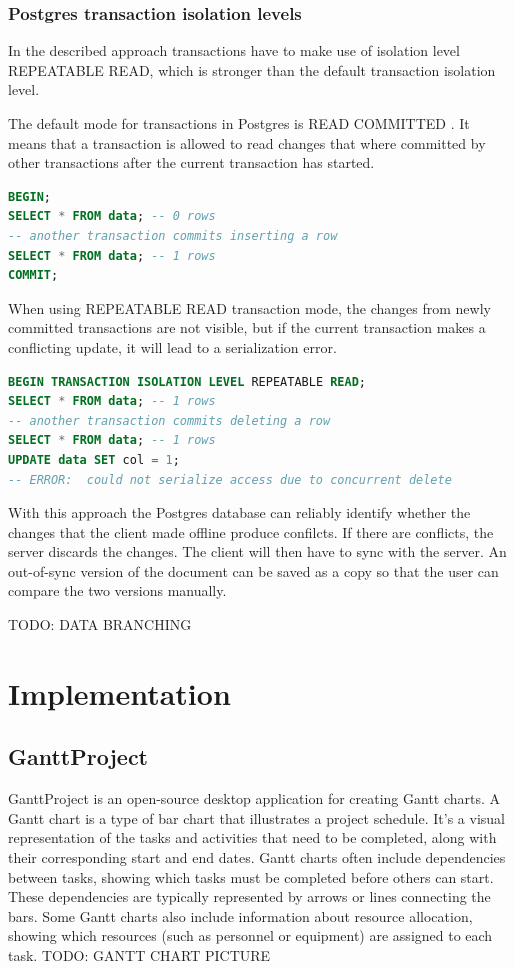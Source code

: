 \documentclass[a4paper, 11pt, oneside]{article}
\theoremstyle{definition}
\begin{document}
\subsubsection{Postgres transaction isolation levels} 
In the described approach transactions have to make use of isolation level REPEATABLE READ, which is stronger than the default transaction isolation level.

The default mode for transactions in Postgres is READ COMMITTED \cite{tisolevel}. It means that a transaction is allowed to read changes that where committed by other transactions after the current transaction has started. 

\begin{lstlisting}[language=SQL]
BEGIN;
SELECT * FROM data; -- 0 rows
-- another transaction commits inserting a row
SELECT * FROM data; -- 1 rows
COMMIT;
\end{lstlisting}

When using REPEATABLE READ transaction mode, the changes from newly committed transactions are not visible, but if the current transaction makes a conflicting update, it will lead to a serialization error.

\begin{lstlisting}[language=SQL]
BEGIN TRANSACTION ISOLATION LEVEL REPEATABLE READ;
SELECT * FROM data; -- 1 rows
-- another transaction commits deleting a row
SELECT * FROM data; -- 1 rows
UPDATE data SET col = 1;
-- ERROR:  could not serialize access due to concurrent delete
\end{lstlisting}

With this approach the Postgres database can reliably identify whether the changes that the client made offline produce confilcts. If there are conflicts, the server discards the changes. The client will then have to sync with the server. An out-of-sync version of the document can be saved as a copy so that the user can compare the two versions manually.

TODO: DATA BRANCHING

\section{Implementation}

\subsection{GanttProject}

GanttProject is an open-source desktop application for creating Gantt charts. A Gantt chart is a type of bar chart that illustrates a project schedule. It's a visual representation of the tasks and activities that need to be completed, along with their corresponding start and end dates. Gantt charts often include dependencies between tasks, showing which tasks must be completed before others can start. These dependencies are typically represented by arrows or lines connecting the bars. Some Gantt charts also include information about resource allocation, showing which resources (such as personnel or equipment) are assigned to each task. TODO: GANTT CHART PICTURE
\end{document}
